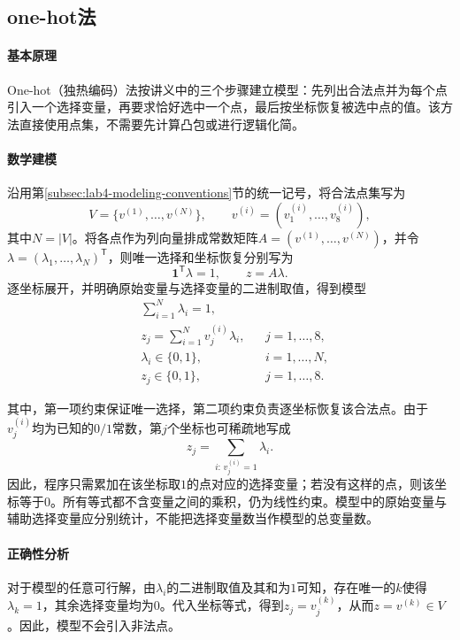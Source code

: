 \subsection{one-hot法}
\label{subsec:lab4-one-hot}

\paragraph{基本原理}

One-hot（独热编码）法按讲义中的三个步骤建立模型：先列出合法点并为每个点引入一个选择变量，再要求恰好选中一个点，最后按坐标恢复被选中点的值。该方法直接使用点集，不需要先计算凸包或进行逻辑化简。

\paragraph{数学建模}

沿用第\ref{subsec:lab4-modeling-conventions}节的统一记号，将合法点集写为
\[
V=\{v^{(1)},\ldots,v^{(N)}\},
\qquad
v^{(i)}=(v^{(i)}_1,\ldots,v^{(i)}_8),
\]
其中$N=|V|$。将各点作为列向量排成常数矩阵$A=(v^{(1)},\ldots,v^{(N)})$，并令$\lambda=(\lambda_1,\ldots,\lambda_N)^{\mathsf T}$，则唯一选择和坐标恢复分别写为
\[
\boldsymbol{1}^{\mathsf T}\lambda=1,
\qquad
z=A\lambda.
\]
逐坐标展开，并明确原始变量与选择变量的二进制取值，得到模型
\begin{equation}
\boxed{
\begin{aligned}
&\sum_{i=1}^{N}\lambda_i=1,\\
&z_j=\sum_{i=1}^{N}v^{(i)}_j\lambda_i,
&&j=1,\ldots,8,\\
&\lambda_i\in\{0,1\},
&&i=1,\ldots,N,\\
&z_j\in\{0,1\},
&&j=1,\ldots,8.
\end{aligned}
}
\label{eq:lab4-one-hot-model}
\end{equation}

其中，第一项约束保证唯一选择，第二项约束负责逐坐标恢复该合法点。由于$v^{(i)}_j$均为已知的$0/1$常数，第$j$个坐标也可稀疏地写成
\[
z_j=\sum_{i:\,v^{(i)}_j=1}\lambda_i.
\]
因此，程序只需累加在该坐标取$1$的点对应的选择变量；若没有这样的点，则该坐标等于$0$。所有等式都不含变量之间的乘积，仍为线性约束。模型中的原始变量与辅助选择变量应分别统计，不能把选择变量数当作模型的总变量数。

\paragraph{正确性分析}

对于模型的任意可行解，由$\lambda_i$的二进制取值及其和为$1$可知，存在唯一的$k$使得$\lambda_k=1$，其余选择变量均为$0$。代入坐标等式，得到$z_j=v^{(k)}_j$，从而$z=v^{(k)}\in V$。因此，模型不会引入非法点。

